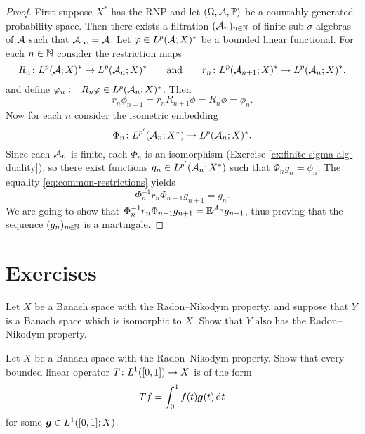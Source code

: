 \begin{proof}
  First suppose $X^*$ has the RNP and let $(\Omega, \mathcal{A}, \mathbb{P})$ be a countably generated probability space.
  Then there exists a filtration $(\mathcal{A}_n)_{n \in \mathbb{N}}$ of finite sub-$\sigma$-algebras of $\mathcal{A}$ such that $\mathcal{A}_\infty = \mathcal{A}$.
  Let $\varphi \in L^p(\mathcal{A};X)^*$ be a bounded linear functional.
  For each $n \in \mathbb{N}$ consider the restriction maps
  \begin{equation*}
    R_n \colon L^{p}(\mathcal{A};X)^* \rightarrow L^{p}(\mathcal{A}_{n};X)^* \qquad \text{and} \qquad r_n \colon L^{p}(\mathcal{A}_{n+1};X)^* \rightarrow L^{p}(\mathcal{A}_{n};X)^*,
  \end{equation*}
  and define $\varphi_n := R_n \varphi \in L^p(\mathcal{A}_n;X)^*$.
  Then
  \begin{equation}\label{eq:common-restrictions}
    r_n \phi_{n+1} = r_n R_{n+1} \phi = R_n \phi = \phi_n.
  \end{equation}
  Now for each $n$ consider the isometric embedding
  \begin{equation*}
    \Phi_n \colon L^{p'}(\mathcal{A}_n;X^*) \rightarrow L^p(\mathcal{A}_n;X)^*.
  \end{equation*}
  Since each $\mathcal{A}_n$ is finite, each $\Phi_n$ is an isomorphism (Exercise \ref{ex:finite-sigma-alg-duality}), so there exist functions $g_n \in L^{p'}(\mathcal{A}_n;X^*)$ such that $\Phi_n g_n = \phi_n$.
  The equality \eqref{eq:common-restrictions} yields
  \begin{equation*}
    \Phi_{n}^{-1} r_n \Phi_{n+1} g_{n+1} = g_n.
  \end{equation*}
  We are going to show that $\Phi_{n}^{-1} r_n \Phi_{n+1} g_{n+1} = \mathbb{E}^{\mathcal{A}_n} g_{n+1}$, thus proving that the sequence $(g_n)_{n \in \mathbb{N}}$ is a martingale.
\end{proof}



\section*{Exercises}

\begin{exercise}
  Let $X$ be a Banach space with the Radon--Nikodym property, and suppose that $Y$ is a Banach space which is isomorphic to $X$.
  Show that $Y$ also has the Radon--Nikodym property.
\end{exercise}

\begin{exercise}
  Let $X$ be a Banach space with the Radon--Nikodym property.
  Show that every bounded linear operator $T \colon L^1([0,1]) \rightarrow X$ is of the form
  \begin{equation*}
    Tf = \int_0^1 f(t) \bm{g}(t) \, \mathrm{d} t
  \end{equation*}
  for some $\bm{g} \in L^1([0,1];X)$.
\end{exercise}

